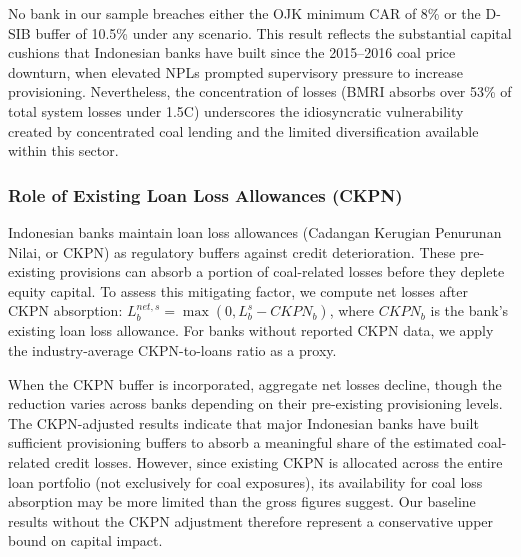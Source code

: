 No bank in our sample breaches either the OJK minimum CAR of 8\% or the D-SIB buffer of 10.5\% under any scenario. This result reflects the substantial capital cushions that Indonesian banks have built since the 2015--2016 coal price downturn, when elevated NPLs prompted supervisory pressure to increase provisioning. Nevertheless, the concentration of losses (BMRI absorbs over 53\% of total system losses under 1.5\textdegree C) underscores the idiosyncratic vulnerability created by concentrated coal lending and the limited diversification available within this sector.

\subsubsection{Role of Existing Loan Loss Allowances (CKPN)}

Indonesian banks maintain loan loss allowances (Cadangan Kerugian Penurunan Nilai, or CKPN) as regulatory buffers against credit deterioration. These pre-existing provisions can absorb a portion of coal-related losses before they deplete equity capital. To assess this mitigating factor, we compute net losses after CKPN absorption: $L_b^{net,s} = \max(0, L_b^s - CKPN_b)$, where $CKPN_b$ is the bank's existing loan loss allowance. For banks without reported CKPN data, we apply the industry-average CKPN-to-loans ratio as a proxy.

When the CKPN buffer is incorporated, aggregate net losses decline, though the reduction varies across banks depending on their pre-existing provisioning levels. The CKPN-adjusted results indicate that major Indonesian banks have built sufficient provisioning buffers to absorb a meaningful share of the estimated coal-related credit losses. However, since existing CKPN is allocated across the entire loan portfolio (not exclusively for coal exposures), its availability for coal loss absorption may be more limited than the gross figures suggest. Our baseline results without the CKPN adjustment therefore represent a conservative upper bound on capital impact.

